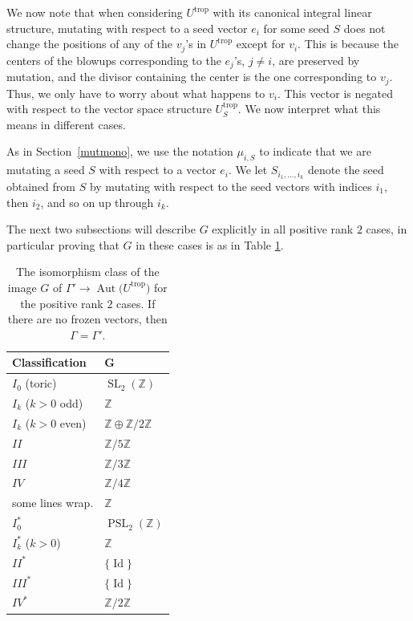 \documentclass[pdftex]{sigma}
\numberwithin{equation}{section}
\numberwithin{figure}{section}
\numberwithin{table}{section}
\DeclareMathOperator{\Id}{Id}
\DeclareMathOperator{\SL}{SL}
\DeclareMathOperator{\PSL}{PSL}
\DeclareMathOperator{\trop}{trop}
\DeclareMathOperator{\Aut}{Aut}
\let\bb=\mathbb
\let\rar=\rightarrow
\theoremstyle{definition}
\begin{document}
We now note that when considering $U^{\trop}$ with its canonical integral linear structure, mutating with respect to a seed vector $e_i$ for some seed $S$ does not change the positions of any of the $v_j$'s in $U^{\trop}$ except for $v_i$. This is because the centers of the blowups corresponding to the $e_j$'s, $j\neq i$, are preserved by mutation, and the divisor containing the center is the one corresponding to $v_j$. Thus, we only have to worry about what happens to $v_i$. This vector is negated with respect to the vector space structure $U^{\trop}_S$. We now interpret what this means in different cases.

As in Section~\ref{mutmono}, we use the notation $\mu_{i,S}$ to indicate that we are mutating a seed $S$ with respect to a vector $e_i$. We let $S_{i_1,\dots,i_k}$ denote the seed obtained from $S$ by mutating with respect to the seed vectors with indices $i_1$, then $i_2$, and so on up through $i_k$.

The next two subsections will describe $G$ explicitly in all positive rank $2$ cases, in particular proving that $G$ in these cases is as in Table \ref{ClusterModularTable}.

\begin{table}[t] \centering
 \begin{tabular}{ | l | l |}
 \hline
 Classification & G 	 \\ \hline
 $I_0$ (toric) & $\SL_2(\bb{Z})$ \\ \hline
 $I_k$ ($k>0$ odd) & $\bb{Z}$ \\ \hline
 $I_k$ ($k>0$ even) & $\bb{Z}\oplus \bb{Z}/2\bb{Z}$ \\ \hline
 $II$ & $\bb{Z}/5\bb{Z}$ \\ \hline
 $III$ & $\bb{Z}/3\bb{Z}$ \\ \hline
 $IV$ & $\bb{Z}/4\bb{Z}$ \\ \hline
 some lines wrap. & $\bb{Z}$ \\ \hline
 $I^*_0$ & $\PSL_2(\bb{Z})$ \\ \hline
 $I^*_k$ ($k>0$) & $\bb{Z}$ \\ \hline
 $II^*$ & $\{\Id\}$ \\ \hline
 $III^*$ & $\{\Id\}$ \\ \hline
 $IV^*$ & $\bb{Z}/2\bb{Z}$ \\ \hline
 \end{tabular}\caption{The isomorphism class of the image $G$ of $\Gamma'\rar \Aut\big(U^{\trop}\big)$ for the positive rank $2$ cases.
 If there are no frozen vectors, then $\Gamma=\Gamma'$.}\label{ClusterModularTable}
 \end{table}
\end{document}
